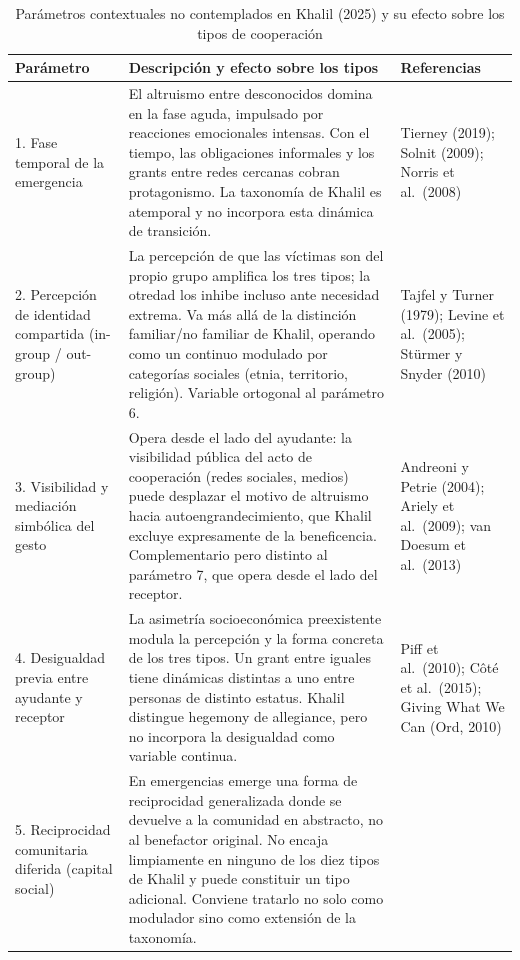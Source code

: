 \documentclass[a4paper,11pt]{article}
\begin{document}
\begin{table}
    \centering
    \small
    \caption{Parámetros contextuales no contemplados en Khalil (2025) y su efecto sobre los tipos de cooperación}
    \label{tab:parametros-contextuals}
    \begin{tabular}{p{5cm} p{7.5cm} p{3.5cm}}
        \toprule
        \textbf{Parámetro} & \textbf{Descripción y efecto sobre los tipos} & \textbf{Referencias} \\
        \midrule
        1. Fase temporal de la emergencia
        & El altruismo entre desconocidos domina en la fase aguda, impulsado por reacciones emocionales intensas. Con el tiempo, las obligaciones informales y los grants entre redes cercanas cobran protagonismo. La taxonomía de Khalil es atemporal y no incorpora esta dinámica de transición.
        & Tierney (2019); Solnit (2009); Norris et al.\ (2008) \\
        \midrule
        2. Percepción de identidad compartida (in-group / out-group)
        & La percepción de que las víctimas son del propio grupo amplifica los tres tipos; la otredad los inhibe incluso ante necesidad extrema. Va más allá de la distinción familiar/no familiar de Khalil, operando como un continuo modulado por categorías sociales (etnia, territorio, religión). Variable ortogonal al parámetro 6.
        & Tajfel y Turner (1979); Levine et al.\ (2005); Stürmer y Snyder (2010) \\
        \midrule
        3. Visibilidad y mediación simbólica del gesto
        & Opera desde el lado del ayudante: la visibilidad pública del acto de cooperación (redes sociales, medios) puede desplazar el motivo de altruismo hacia autoengrandecimiento, que Khalil excluye expresamente de la beneficencia. Complementario pero distinto al parámetro 7, que opera desde el lado del receptor.
        & Andreoni y Petrie (2004); Ariely et al.\ (2009); van Doesum et al.\ (2013) \\
        \midrule
        4. Desigualdad previa entre ayudante y receptor
        & La asimetría socioeconómica preexistente modula la percepción y la forma concreta de los tres tipos. Un grant entre iguales tiene dinámicas distintas a uno entre personas de distinto estatus. Khalil distingue hegemony de allegiance, pero no incorpora la desigualdad como variable continua.
        & Piff et al.\ (2010); Côté et al.\ (2015); Giving What We Can (Ord, 2010) \\
        \midrule
        5. Reciprocidad comunitaria diferida (capital social)
        & En emergencias emerge una forma de reciprocidad generalizada donde se devuelve a la comunidad en abstracto, no al benefactor original. No encaja limpiamente en ninguno de los diez tipos de Khalil y puede constituir un tipo adicional. Conviene tratarlo no solo como modulador sino como extensión de la taxonomía.

\end{tabular}
\end{table}
\end{document}
